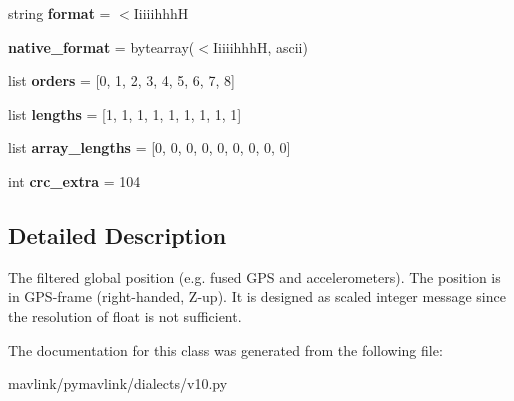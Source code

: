 \begin{DoxyCompactItemize}
\item 
\mbox{\label{classpymavlink_1_1dialects_1_1v10_1_1MAVLink__global__position__int__message_acc3c624d475b9e526de106eeab01d504}} 
string {\bfseries format} = \textquotesingle{}$<$IiiiihhhH\textquotesingle{}
\item 
\mbox{\label{classpymavlink_1_1dialects_1_1v10_1_1MAVLink__global__position__int__message_aab99f5bf87e9f477433eeb3b4f4dff29}} 
{\bfseries native\+\_\+format} = bytearray(\textquotesingle{}$<$IiiiihhhH\textquotesingle{}, \textquotesingle{}ascii\textquotesingle{})
\item 
\mbox{\label{classpymavlink_1_1dialects_1_1v10_1_1MAVLink__global__position__int__message_a9072310040764fa04a47b952d290f780}} 
list {\bfseries orders} = \mbox{[}0, 1, 2, 3, 4, 5, 6, 7, 8\mbox{]}
\item 
\mbox{\label{classpymavlink_1_1dialects_1_1v10_1_1MAVLink__global__position__int__message_ab270bfe89cfd12f189f575fe8990767d}} 
list {\bfseries lengths} = \mbox{[}1, 1, 1, 1, 1, 1, 1, 1, 1\mbox{]}
\item 
\mbox{\label{classpymavlink_1_1dialects_1_1v10_1_1MAVLink__global__position__int__message_a48b6265cd4c7e8ae38990b4139daa680}} 
list {\bfseries array\+\_\+lengths} = \mbox{[}0, 0, 0, 0, 0, 0, 0, 0, 0\mbox{]}
\item 
\mbox{\label{classpymavlink_1_1dialects_1_1v10_1_1MAVLink__global__position__int__message_a762b17e1d0a8734fe8b67417b74ab877}} 
int {\bfseries crc\+\_\+extra} = 104
\end{DoxyCompactItemize}


\subsection{Detailed Description}
\begin{DoxyVerb}The filtered global position (e.g. fused GPS and
accelerometers). The position is in GPS-frame (right-handed,
Z-up). It                is designed as scaled integer message
since the resolution of float is not sufficient.
\end{DoxyVerb}
 

The documentation for this class was generated from the following file\+:\begin{DoxyCompactItemize}
\item 
mavlink/pymavlink/dialects/v10.\+py\end{DoxyCompactItemize}

